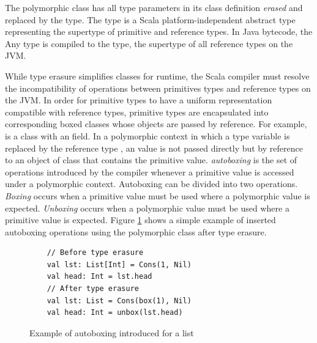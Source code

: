 The polymorphic  class has all type parameters in its class definition \textit{erased} and replaced by the  type.
The  type is a Scala platform-independent\cite{scala:overview} abstract type representing the supertype of primitive and reference types.
In Java bytecode, the {Any} type is compiled to the  type, the supertype of all reference types on the JVM.

While type erasure simplifies classes for runtime, the Scala compiler must resolve the incompatibility of operations between primitives types and reference types on the JVM\cite{java:vm-spec}.
In order for primitive types to have a uniform representation compatible with reference types, primitive types are encapsulated into corresponding boxed classes whose objects are passed by reference.
For example,  is a class with an  field.
In a polymorphic context in which a type variable is replaced by the reference type , an  value is not passed directly but by reference to an object of class  that contains the primitive value.
\textit{autoboxing}\cite{java:autoboxing} is the set of operations introduced by the compiler whenever a primitive value is accessed under a polymorphic context. 
Autoboxing can be divided into two operations.
\textit{Boxing} occurs when a primitive value must be used where a polymorphic value is expected.
\textit{Unboxing} occurs when a polymorphic value must be used where a primitive value is expected.
Figure \ref{example:autoboxing} shows a simple example of inserted autoboxing operations using the polymorphic  class after type erasure.

\begin{figure}[!htb]
	\begin{verbatim}
	// Before type erasure 	
	val lst: List[Int] = Cons(1, Nil)
	val head: Int = lst.head
	// After type erasure
	val lst: List = Cons(box(1), Nil)
	val head: Int = unbox(lst.head) 
	\end{verbatim}
	\caption{Example of autoboxing introduced for a list}
	\label{example:autoboxing}
\end{figure}


